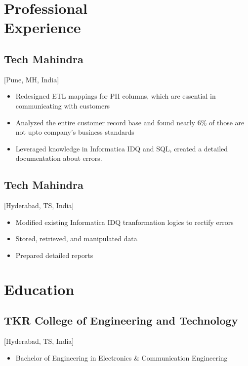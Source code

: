 \documentclass{mycv}
\begin{document}
\maketitle%
\section{Professional \\ Experience }

\subsection{Tech Mahindra}[Pune, MH, India]
\begin{positions}
\end{positions}

\begin{itemize}
  \item Redesigned ETL mappings for PII columns, which are essential in communicating with customers
  \item Analyzed the entire customer record base and found nearly 6\% of those are not upto company's business standards
  \item Leveraged knowledge in Informatica IDQ and SQL, created a detailed documentation about errors.  
\end{itemize}

\subsection{Tech Mahindra}[Hyderabad, TS, India]
\begin{positions}
\end{positions}

\begin{itemize}
  \item Modified existing Informatica IDQ tranformation logics to rectify errors
  \item Stored, retrieved, and manipulated data
  \item Prepared detailed reports
\end{itemize}

\section{Education}

\subsection{TKR College of Engineering and Technology}[Hyderabad, TS, India]
\vspace{-\parskip}%
\begin{itemize}[label={}]
  \item Bachelor of Engineering in Electronics \& Communication Engineering 
\end{itemize}
\end{document}
